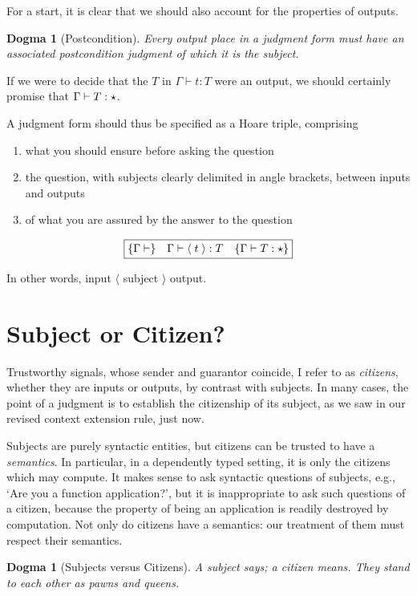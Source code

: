 \documentclass[format=acmsmall, screen, review, anonymous, timestamp]{acmart}
\newtheorem{dog}[thm]{Dogma}
\newcommand{\Ty}{\blue{\star}}
\begin{document}
For a start, it is clear that we should also account for the
properties of outputs.

\begin{dog}[Postcondition]
  Every output place in a judgment form must have an associated postcondition
  judgment of which it is the subject.
\end{dog}

If we were to decide that the $T$ in $\Gamma \vdash t : T$ were an
output, we should certainly promise that $\Gamma\vdash T : \Ty$.

A judgment form should thus be specified as a Hoare triple, comprising
\begin{enumerate}
\item what you should ensure before asking the question
\item the question, with subjects clearly delimited in angle brackets,
  between inputs and outputs
\item of what you are assured by the answer to the question
\end{enumerate}
\[
\framebox{\(
  \{\Gamma \vdash\}\quad\Gamma \vdash \langle\;t\;\rangle : T\quad
  \{\Gamma \vdash T : \Ty\}
  \)}
\]

In other words, input $\langle$ subject $\rangle$ output.


\section{Subject or Citizen?}

Trustworthy signals, whose sender and guarantor coincide, I refer to
as \emph{citizens}, whether they are inputs or outputs, by contrast
with subjects. In many cases, the point of a judgment is to establish
the citizenship of its subject, as we saw in our revised context
extension rule, just now.

Subjects are purely syntactic entities, but citizens can be trusted to
have a \emph{semantics}. In particular, in a dependently typed
setting, it is only the citizens which may compute. It makes sense to
ask syntactic questions of subjects, e.g., `Are you a function
application?', but it is inappropriate to ask such questions of a
citizen, because the property of being an application is readily
destroyed by computation. Not only do citizens have a semantics: our
treatment of them must respect their semantics.

\begin{dog}[Subjects versus Citizens]
  A subject says; a citizen means. They stand to each other as pawns
  and queens.
\end{dog}
\end{document}

